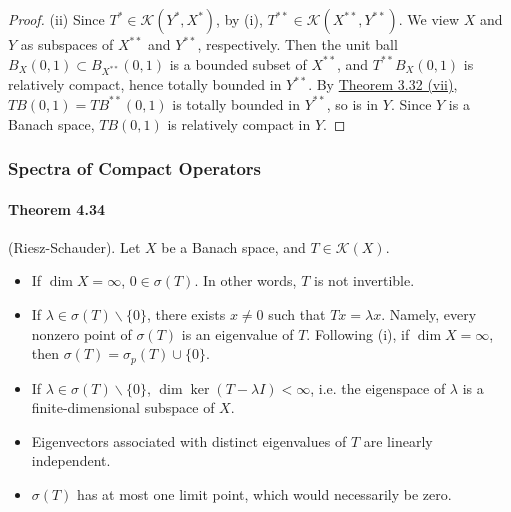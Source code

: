 \documentclass{article}
\begin{document}
\begin{proof}
(ii) Since $T^*\in\mathcal{K}(Y^*,X^*)$, by (i), $T^{**}\in\mathcal{K}(X^{**},Y^{**})$. We view $X$ and $Y$ as subspaces of $X^{**}$ and $Y^{**}$, respectively. Then the unit ball $B_X(0,1)\subset B_{X^{**}}(0,1)$ is a bounded subset of $X^{**}$, and $T^{**}B_X(0,1)$ is relatively compact, hence totally bounded in $Y^{**}$. By \hyperref[thm:3.32]{Theorem 3.32 (vii)}, $TB(0,1)=TB^{**}(0,1)$ is totally bounded in $Y^{**}$, so is in $Y$. Since $Y$ is a Banach space, $TB(0,1)$ is relatively compact in $Y$.
\end{proof}

\subsubsection{Spectra of Compact Operators}
\paragraph{Theorem 4.34\label{thm:4.34}} (Riesz-Schauder). Let $X$ be a Banach space, and $T\in\mathcal{K}(X)$.
\begin{itemize}
	\item[(i)] If $\dim X=\infty$, $0\in\sigma(T)$. In other words, $T$ is not invertible.
	\item[(ii)] If $\lambda\in\sigma(T)\backslash\{0\}$, there exists $x\neq 0$ such that $Tx=\lambda x$. Namely, every nonzero point of $\sigma(T)$ is an eigenvalue of $T$. Following (i), if $\dim X=\infty$, then $\sigma(T)=\sigma_p(T)\cup\{0\}$.
	\item[(iii)] If $\lambda\in\sigma(T)\backslash\{0\}$, $\dim\ker(T-\lambda I)<\infty$, i.e. the eigenspace  of $\lambda$ is a finite-dimensional subspace of $X$.
	\item[(iv)] Eigenvectors associated with distinct eigenvalues of $T$ are linearly independent.
	\item[(v)] $\sigma(T)$ has at most one limit point, which would necessarily be zero.
\end{itemize}
\end{document}
